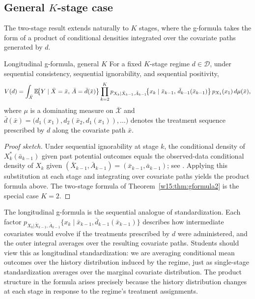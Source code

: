 \documentclass[master.tex]{subfiles}
\begin{document}
\subsection{General \texorpdfstring{$K$}{K}-stage case}

The two-stage result extends naturally to $K$ stages, where the g-formula takes the form of a product of conditional densities integrated over the covariate paths generated by $d$.

\begin{thm}{Longitudinal g-formula, general $K$}
\label{w15:thm:gformula}
For a fixed $K$-stage regime $d \in \mathcal{D}$, under sequential consistency, sequential ignorability, and sequential positivity,
\[
V(d)
=
\int_{\bar{\mathcal{X}}}
\mathbb{E}\!\bigl\{Y \mid \bar{X}=\bar{x},\, \bar{A}=\bar{d}(\bar{x})\bigr\}
\prod_{k=2}^{K}
p_{X_k\mid\bar{X}_{k-1},\bar{A}_{k-1}}\!\bigl\{x_k \mid \bar{x}_{k-1},\, \bar{d}_{k-1}(\bar{x}_{k-1})\bigr\}
\, p_{X_1}(x_1)\,d\mu(\bar{x}),
\]
where $\mu$ is a dominating measure on $\bar{\mathcal{X}}$ and $\bar{d}(\bar{x}) = \bigl(d_1(x_1), d_2(\bar{x}_2, d_1(x_1)), \ldots\bigr)$ denotes the treatment sequence prescribed by $d$ along the covariate path $\bar{x}$.
\end{thm}

\begin{proof}[Proof sketch]
Under sequential ignorability at stage $k$, the conditional density of $X_k^*(\bar{a}_{k-1})$ given past potential outcomes equals the observed-data conditional density of $X_k$ given $(\bar{X}_{k-1}, \bar{A}_{k-1}) = (\bar{x}_{k-1}, \bar{a}_{k-1})$; see \citet{robins1986new}. Applying this substitution at each stage and integrating over covariate paths yields the product formula above. The two-stage formula of Theorem~\ref{w15:thm:gformula2} is the special case $K=2$.
\end{proof}

\begin{remark}
The longitudinal g-formula is the sequential analogue of standardization. Each factor $p_{X_k|\bar{X}_{k-1},\bar{A}_{k-1}}\{x_k \mid \bar{x}_{k-1}, \bar{d}_{k-1}(\bar{x}_{k-1})\}$ describes how intermediate covariates would evolve if the treatments prescribed by $d$ were administered, and the outer integral averages over the resulting covariate paths. Students should view this as longitudinal standardization: we are averaging conditional mean outcomes over the history distribution induced by the regime, just as single-stage standardization averages over the marginal covariate distribution. The product structure in the formula arises precisely because the history distribution changes at each stage in response to the regime's treatment assignments.
\end{remark}
\end{document}
